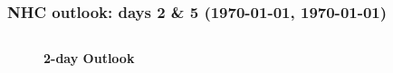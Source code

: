 \documentclass[aspectratio=169, 10pt]{beamer}
\begin{document}
\begin{frame}
\vspace{-1cm}
\frametitle{NHC outlook: days 2 \& 5 ({\AdvanceDate[+2]\today}, {\AdvanceDate[+5]\today})}

\vspace{-.3cm}
\begin{columns}
\begin{column}{0.5\textwidth}


\begin{figure}
\textbf{2-day Outlook} \\
\end{figure}

\end{column}
\begin{column}{0.5\textwidth}


\end{column}
\end{columns}
\end{frame}
\end{document}
